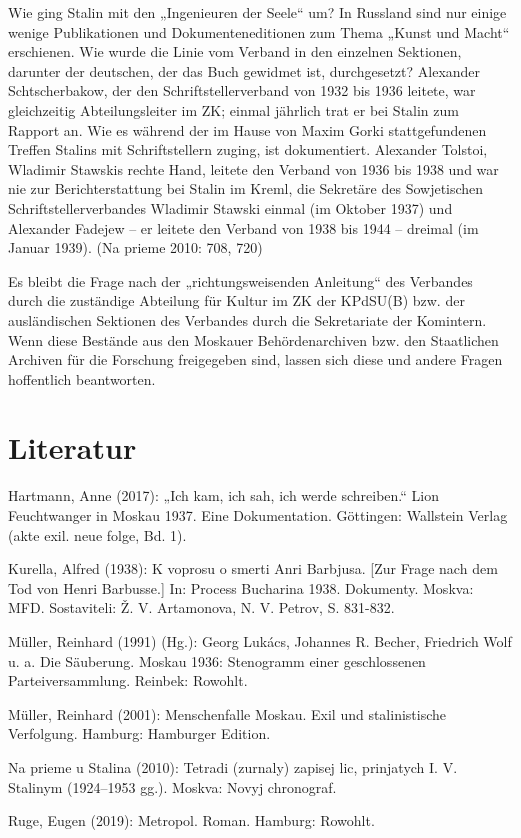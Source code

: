 \begin{multicols*}{2}
Wie ging Stalin mit den „Ingenieuren der Seele“ um? In Russland sind nur einige wenige Publikationen und Dokumenteneditionen zum Thema „Kunst und Macht“ erschienen. Wie wurde die Linie vom Verband in den einzelnen Sektionen, darunter der deutschen, der das Buch gewidmet ist, durchgesetzt? Alexander Schtscherbakow, der den Schriftstellerverband von 1932 bis 1936 leitete, war gleichzeitig Abteilungsleiter im ZK; einmal jährlich trat er bei Stalin zum Rapport an. Wie es während der im Hause von Maxim Gorki stattgefundenen Treffen Stalins mit Schriftstellern zuging, ist dokumentiert. Alexander Tolstoi, Wladimir Stawskis rechte Hand, leitete den Verband von 1936 bis 1938 und war nie zur Berichterstattung bei Stalin im Kreml, die Sekretäre des Sowjetischen Schriftstellerverbandes Wladimir Stawski einmal (im Oktober 1937) und Alexander Fadejew – er leitete den Verband von 1938 bis 1944 – dreimal (im Januar 1939). (Na prieme 2010: 708, 720)

Es bleibt die Frage nach der „richtungsweisenden Anleitung“ des Verbandes durch die zuständige Abteilung für Kultur im ZK der KPdSU(B) bzw. der ausländischen Sektionen des Verbandes durch die Sekretariate der Komintern. Wenn diese Bestände aus den Moskauer Behördenarchiven bzw. den Staatlichen Archiven für die Forschung freigegeben sind, lassen sich diese und andere Fragen hoffentlich beantworten.\\\bigskip



\section{Literatur}
\begin{bibdescription}
    \item Hartmann, Anne (2017): „Ich kam, ich sah, ich werde schreiben.“ Lion Feuchtwanger in Moskau 1937. Eine Dokumentation. Göttingen: Wallstein Verlag (akte exil. neue folge, Bd. 1). 
    \item Kurella, Alfred (1938): K voprosu o smerti Anri Barbjusa. [Zur Frage nach dem Tod von Henri Barbusse.] In: Process Bucharina 1938. Dokumenty. Moskva: MFD. Sostaviteli: Ž. V. Artamonova, N. V. Petrov, S. 831-832.
    \item Müller, Reinhard (1991) (Hg.): Georg Lukács, Johannes R. Becher, Friedrich Wolf u. a. Die Säuberung. Moskau 1936: Stenogramm einer geschlossenen Parteiversammlung. Reinbek: Rowohlt.
    \item Müller, Reinhard (2001): Menschenfalle Moskau. Exil und stalinistische Verfolgung. Hamburg: Hamburger Edition.
    \item Na prieme u Stalina (2010): Tetradi (zurnaly) zapisej lic, prinjatych I. V. Stalinym (1924–1953 gg.). Moskva: Novyj chronograf.
    \item Ruge, Eugen (2019): Metropol. Roman. Hamburg: Rowohlt.
\end{bibdescription}



\end{multicols*}
